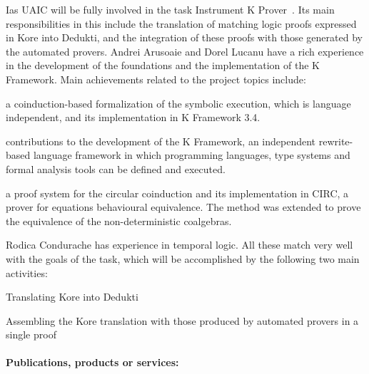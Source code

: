 \begin{sitedescription}{Ias}
UAIC will be fully involved in the task Instrument K Prover~. Its main responsibilities in this 
include the translation of matching logic proofs expressed in Kore into Dedukti, and the integration
of these proofs with those generated by the automated provers. Andrei Arusoaie and 
Dorel Lucanu have a rich experience in the development of the foundations and the implementation of the K Framework.
Main achievements related to the project topics include:
\begin{compactitem}
\item  a coinduction-based formalization of the symbolic execution, which is language independent, and its implementation in K Framework 3.4.
\item contributions to the development of the K Framework, an independent rewrite-based language framework in which programming languages, type systems and formal analysis tools can be defined and executed.
\item a proof system for the circular coinduction and its implementation in CIRC, a prover for equations behavioural equivalence. The method was extended to prove the equivalence of the non-deterministic coalgebras.
\end{compactitem}
Rodica Condurache has experience in temporal logic. All these match very well with the goals of the task,  which will be  accomplished by the following two main activities:



\begin{compactitem}
\item Translating Kore into Dedukti
\item Assembling the Kore translation with those produced by automated provers in a single proof
\end{compactitem}

\paragraph*{Publications, products or services:}



\end{sitedescription}

